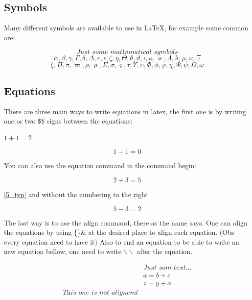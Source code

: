 \subsection{Symbols}

Many different symbols are available to use in \LaTeX{}, for example some common are:

\begin{equation}
    \textit{Just some mathimatical symbols}
\end{equation}
\begin{equation}
    \alpha, \beta, \gamma, \Gamma, \delta, \Delta, \varepsilon, \epsilon, \zeta, \eta, \Theta, \theta, \vartheta, \iota, \kappa, \varkappa, \Lambda, \lambda, \mu, \nu, \Xi
\end{equation}
\begin{equation}
    \xi, \Pi, \pi, \varpi, \rho, \varrho, \Sigma, \sigma, \varsigma, \tau, \Upsilon, \upsilon, \Phi, \phi, \varphi, \chi, \Psi, \psi, \Omega, \omega
\end{equation}

\subsection{Equations}

There are three main ways to write equations in latex, the first one is by writing one or two \$\$ signs between the equations:

$1+1=2$

$$
1-1=0
$$

You can also use the equation command in the command begin:

\begin{equation}\label{5_typ}
    2+3=5
\end{equation}

\eqref{5_typ} 
and without the numbering to the right

\begin{equation*}
    5-3 = 2
\end{equation*}

The last way is to use the align command, there as the name says. One can align the equations by using \{\}\& at the desired place to align each equation. (Obs every equation need to have it) Also to end an equation to be able to write an new equation bellow, one need to write $\backslash \backslash$ after the equation.

\begin{align}
    {}& \textit{Just som text...}\\
    {}& a = b + c\\
    {}& z = y + x\\
    \textit{This one is not alignend}
\end{align}


